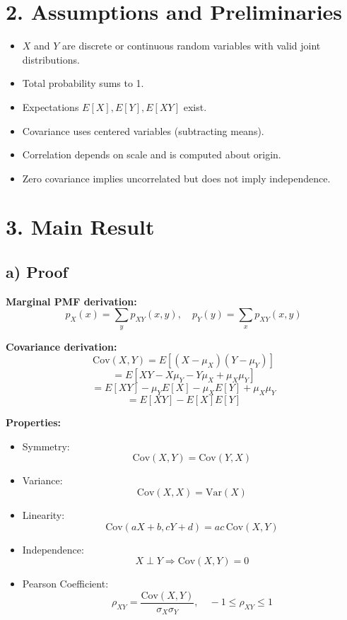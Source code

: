 \documentclass[12pt]{article}
\begin{document}
\section*{2. Assumptions and Preliminaries}

\begin{itemize}
\item $X$ and $Y$ are discrete or continuous random variables with valid joint distributions.
\item Total probability sums to 1.
\item Expectations $E[X], E[Y], E[XY]$ exist.
\item Covariance uses centered variables (subtracting means).
\item Correlation depends on scale and is computed about origin.
\item Zero covariance implies uncorrelated but does not imply independence.
\end{itemize}

\section*{3. Main Result}

\subsection*{a) Proof}

\textbf{Marginal PMF derivation:}
\[
p_X(x) = \sum_y p_{XY}(x,y), \quad p_Y(y) = \sum_x p_{XY}(x,y)
\]

\textbf{Covariance derivation:}
\[
\mathrm{Cov}(X,Y) = E[(X-\mu_X)(Y-\mu_Y)]
\]
\[
= E[XY - X\mu_Y - Y\mu_X + \mu_X \mu_Y]
\]
\[
= E[XY] - \mu_Y E[X] - \mu_X E[Y] + \mu_X \mu_Y
\]
\[
= E[XY] - E[X]E[Y]
\]

\textbf{Properties:}

\begin{itemize}
\item Symmetry:
\[
\mathrm{Cov}(X,Y) = \mathrm{Cov}(Y,X)
\]

\item Variance:
\[
\mathrm{Cov}(X,X) = \mathrm{Var}(X)
\]

\item Linearity:
\[
\mathrm{Cov}(aX+b, cY+d) = ac \, \mathrm{Cov}(X,Y)
\]

\item Independence:
\[
X \perp Y \Rightarrow \mathrm{Cov}(X,Y)=0
\]

\item Pearson Coefficient:
\[
\rho_{XY} = \frac{\mathrm{Cov}(X,Y)}{\sigma_X \sigma_Y}, \quad -1 \leq \rho_{XY} \leq 1
\]
\end{itemize}
\end{document}
